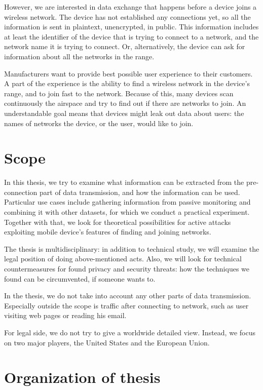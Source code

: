 \documentclass[12pt,a4paper,oneside,pdftex]{report}
\begin{document}
However, we are interested in data exchange that happens before a device joins a wireless network. The device has not established any connections yet, so all the information is sent in plaintext, unencrypted, in public. This information includes at least the identifier of the device that is trying to connect to a network, and the network name it is trying to connect. Or, alternatively, the device can ask for information about all the networks in the range.

Manufacturers want to provide best possible user experience to their customers. A part of the experience is the ability to find a wireless network in the device's range, and to join fast to the network. Because of this, many devices scan continuously the airspace and try to find out if there are networks to join. An understandable goal means that devices might leak out data about users: the names of networks the device, or the user, would like to join.


\section{Scope}
\label{sec:scope}

In this thesis, we try to examine what information can be extracted from the pre-connection part of data transmission, and how the information can be used. Particular use cases include gathering information from passive monitoring and combining it with other datasets, for which we conduct a practical experiment. Together with that, we look for theoretical possibilities for active attacks exploiting mobile device's features of finding and joining networks.

The thesis is multidisciplinary: in addition to technical study, we will examine the legal position of doing above-mentioned acts. Also, we will look for technical countermeasures for found privacy and security threats: how the techniques we found can be circumvented, if someone wants to.

In the thesis, we do not take into account any other parts of data transmission. Especially outside the scope is traffic after connecting to network, such as user visiting web pages or reading his email.

For legal side, we do not try to give a worldwide detailed view. Instead, we focus on two major players, the United States and the European Union.

\section{Organization of thesis}
\end{document}
